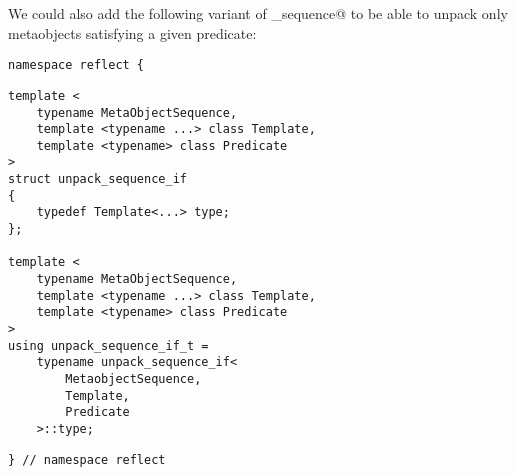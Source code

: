 We could also add the following variant of \verb@unpack_sequence@ to be
able to unpack only metaobjects satisfying a given predicate:

\begin{verbatim}
namespace reflect {
\end{verbatim}
\begin{verbatim}
template <
	typename MetaObjectSequence,
	template <typename ...> class Template,
	template <typename> class Predicate
>
struct unpack_sequence_if
{
	typedef Template<...> type;
};

template <
	typename MetaObjectSequence,
	template <typename ...> class Template,
	template <typename> class Predicate
>
using unpack_sequence_if_t =
	typename unpack_sequence_if<
		MetaobjectSequence,
		Template,
		Predicate
	>::type;
\end{verbatim}
\begin{verbatim}
} // namespace reflect
\end{verbatim}

